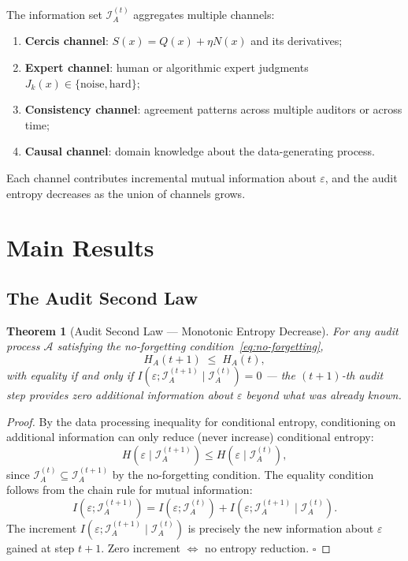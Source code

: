 \documentclass[12pt,a4paper]{article}
\newtheorem{theorem}{Theorem}[section]
\newcommand{\cI}{\mathcal{I}}
\newcommand{\cA}{\mathcal{A}}
\begin{document}
The information set $\cI_A^{(t)}$ aggregates multiple channels:
\begin{enumerate}[label=(\roman*)]
    \item \textbf{Cercis channel}: $S(x)=Q(x)+\eta N(x)$ and its derivatives;
    \item \textbf{Expert channel}: human or algorithmic expert judgments
          $J_k(x)\in\{\mathrm{noise},\mathrm{hard}\}$;
    \item \textbf{Consistency channel}: agreement patterns across multiple
          auditors or across time;
    \item \textbf{Causal channel}: domain knowledge about the data-generating
          process.
\end{enumerate}
Each channel contributes incremental mutual information about $\varepsilon$,
and the audit entropy decreases as the union of channels grows.

\section{Main Results}

\subsection{The Audit Second Law}

\begin{theorem}[Audit Second Law — Monotonic Entropy Decrease]
\label{thm:second-law}
For any audit process $\cA$ satisfying the no-forgetting
condition~\eqref{eq:no-forgetting},
\begin{equation}\label{eq:second-law}
    H_A(t+1) \;\leq\; H_A(t),
\end{equation}
with equality if and only if
$I(\varepsilon; \cI_A^{(t+1)} \mid \cI_A^{(t)}) = 0$ — the $(t+1)$-th audit
step provides zero additional information about $\varepsilon$ beyond what was
already known.
\end{theorem}

\begin{proof}
By the data processing inequality for conditional entropy, conditioning on
additional information can only reduce (never increase) conditional entropy:
\begin{equation}\label{eq:dpi-entropy}
    H(\varepsilon \mid \cI_A^{(t+1)})
    \leq H(\varepsilon \mid \cI_A^{(t)}),
\end{equation}
since $\cI_A^{(t)}\subseteq\cI_A^{(t+1)}$ by the no-forgetting condition.
The equality condition follows from the chain rule for mutual information:
\begin{equation}\label{eq:chain-rule}
    I(\varepsilon; \cI_A^{(t+1)})
    = I(\varepsilon; \cI_A^{(t)})
      + I(\varepsilon; \cI_A^{(t+1)} \mid \cI_A^{(t)}).
\end{equation}
The increment $I(\varepsilon;\cI_A^{(t+1)}\mid\cI_A^{(t)})$ is precisely the
new information about $\varepsilon$ gained at step $t+1$.  Zero increment
$\iff$ no entropy reduction. $\square$
\end{proof}
\end{document}
